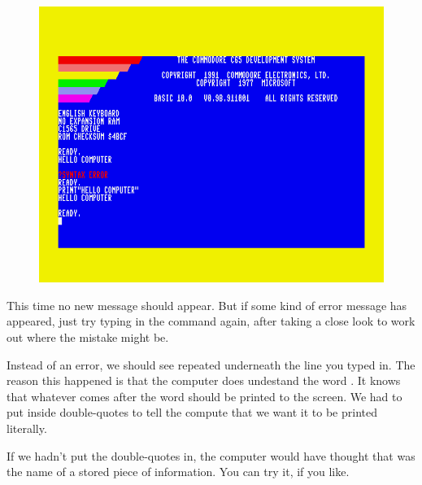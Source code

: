 \setlength{\intextsep}{0pt}%
  \begin{figure}
    \includegraphics[width=\linewidth]{images/print-hello-computer.png}
  \end{figure}

  This time no new  message should appear. But if some kind
  of error message has appeared, just try typing in the command again, after
  taking a close look to work out where the mistake might be.

  Instead of an error, we should see  repeated underneath
  the line you typed in.  The reason this happened is that the computer
  does undestand the word .  It knows that whatever comes after
  the word  should be printed to the screen.  We had to put  inside double-quotes to tell the compute that we want it to be
  printed literally.

  If we hadn't put the double-quotes in, the computer would have thought
  that  was the name of a stored piece of information.
  You can try it, if you like.

